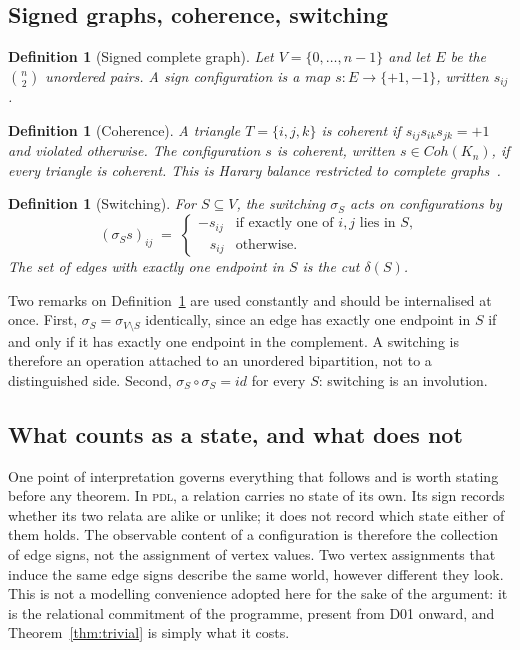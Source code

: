 \documentclass[11pt,a4paper]{article}
\def\mathrm#1{#1}%
\newtheorem{definition}[theorem]{Definition}
\newcommand{\PDL}{\textsc{pdl}}
\newcommand{\Kn}{K_n}
\newcommand{\Coh}{\mathrm{Coh}}
\begin{document}
\subsection{Signed graphs, coherence, switching}

\begin{definition}[Signed complete graph]
Let $V=\{0,\dots,n-1\}$ and let $E$ be the $\binom{n}{2}$ unordered pairs. A sign configuration is a map $s:E\to\{+1,-1\}$, written $s_{ij}$.
\end{definition}

\begin{definition}[Coherence]
A triangle $T=\{i,j,k\}$ is \emph{coherent} if $s_{ij}s_{ik}s_{jk}=+1$ and \emph{violated} otherwise. The configuration $s$ is coherent, written $s\in\Coh(\Kn)$, if every triangle is coherent. This is Harary balance restricted to complete graphs~\citep{Harary1953,Zaslavsky1982}.
\end{definition}

\begin{definition}[Switching]
\label{def:switching}
For $S\subseteq V$, the \emph{switching} $\sigma_S$ acts on configurations by
\[
(\sigma_S s)_{ij} \;=\;
\begin{cases}
-s_{ij} & \text{if exactly one of } i,j \text{ lies in } S,\\
\;\;\;s_{ij} & \text{otherwise.}
\end{cases}
\]
The set of edges with exactly one endpoint in $S$ is the \emph{cut} $\delta(S)$.
\end{definition}

Two remarks on Definition~\ref{def:switching} are used constantly and should be internalised at once. First, $\sigma_S=\sigma_{V\setminus S}$ identically, since an edge has exactly one endpoint in $S$ if and only if it has exactly one endpoint in the complement. A switching is therefore an operation attached to an unordered bipartition, not to a distinguished side. Second, $\sigma_S\circ\sigma_S=\mathrm{id}$ for every $S$: switching is an involution.

\subsection{What counts as a state, and what does not}

One point of interpretation governs everything that follows and is worth stating before any theorem. In \PDL, a relation carries no state of its own. Its sign records whether its two relata are alike or unlike; it does not record which state either of them holds. The observable content of a configuration is therefore the collection of edge signs, not the assignment of vertex values. Two vertex assignments that induce the same edge signs describe the same world, however different they look. This is not a modelling convenience adopted here for the sake of the argument: it is the relational commitment of the programme, present from D01 onward, and Theorem~\ref{thm:trivial} is simply what it costs.
\end{document}
